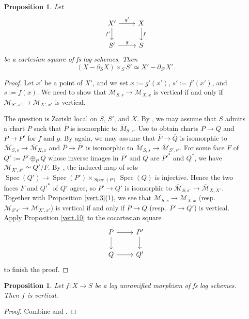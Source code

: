 \documentclass[10pt]{amsart}
\newtheorem{prop}[thm]{Proposition}
\theoremstyle{definition}
\theoremstyle{remark}
\numberwithin{equation}{subsection}
\newcommand{\cM}{\mathcal{M}}
\DeclareMathOperator{\Spec}{Spec}
\newcommand{\ol}{\overline}
\begin{document}
\begin{prop}
\label{vert.5}
Let
\[
\begin{tikzcd}
X'\ar[d,"f'"']\ar[r,"g'"]&
X\ar[d,"f"]
\\
S'\ar[r,"g"]&
S
\end{tikzcd}
\]
be a cartesian square of fs log schemes.
Then
\[
(X-\partial_S X)\times_S S'
\simeq
X'-\partial_{S'}X'.
\]
\end{prop}
\begin{proof}
Let $x'$ be a point of $X'$, and we set $x:=g'(x')$, $s':=f'(x')$, and $s:=f(x)$.
We need to show that $\cM_{S,s}\to \cM_{X,x}$ is vertical if and only if $\cM_{S',s'}\to \cM_{X',x'}$ is vertical.

The question is Zariski local on $S$, $S'$, and $X$.
By \cite[Remark II.2.3.2]{Ogu},
we may assume that $S$ admits a chart $P$ such that $\ol{P}$ is isomorphic to $\ol{M}_{S,s}$.
Use \cite[Proposition II.2.4.2]{Ogu} to obtain charts $P\to Q$ and $P\to P'$ for $f$ and $g$.
By \cite[Remark II.2.3.2]{Ogu} again,
we may assume that $\ol{P}\to \ol{Q}$ is isomorphic to $\ol{\cM}_{S,s}\to \ol{\cM}_{X,x}$ and $\ol{P}\to \ol{P'}$ is isomorphic to $\ol{\cM}_{S,s}\to \ol{\cM}_{S',s'}$.
For some face $F$ of $Q':=P'\oplus_P Q$ whose inverse images in $P'$ and $Q$ are $P'^*$ and $Q^*$, we have $\ol{\cM}_{X',x'}\simeq Q'/F$.
By \cite[Corollaries I.2.3.8, I.4.2.16]{Ogu},
the induced map of sets $\Spec(Q')\to \Spec(P')\times_{\Spec(P)}\Spec(Q)$ is injective.
Hence the two faces $F$ and $Q'^*$ of $Q'$ agree,
so $\ol{P'}\to \ol{Q'}$ is isomorphic to $\ol{\cM}_{S,s'}\to \ol{\cM}_{X,X'}$.
Together with Proposition \ref{vert.3}(1),
we see that $\cM_{S,s}\to \cM_{X,x}$ (resp.\ $\cM_{S's'}\to \cM_{X',x'}$) is vertical if and only if $P\to Q$ (resp.\ $P'\to Q'$) is vertical.
Apply Proposition \ref{vert.10} to the cocartesian square
\[
\begin{tikzcd}
P\ar[d]\ar[r]&
P'\ar[d]
\\
Q\ar[r]&
Q'
\end{tikzcd}
\]
to finish the proof.
\end{proof}



\begin{prop}
\label{vert.8}
Let $f\colon X\to S$ be a log unramified morphism of fs log schemes.
Then $f$ is vertical.
\end{prop}
\begin{proof}
Combine \cite[Proposition IV.3.4.1]{Ogu} and \cite[Lemma 5.6(1)]{zbMATH05809283}.
\end{proof}
\end{document}
